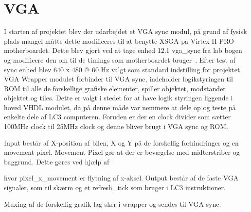 \section{VGA}
I starten af projektet blev der udarbejdet et VGA sync modul, på grund af fysisk plads mangel måtte dette modificeres til at benytte XSGA på Virtex-II PRO motherboardet. Dette blev gjort ved at tage enhed 12.1 vga\_sync fra lab bogen~\cite{chu} og modificere den om til de timings som motherboardet bruger~\cite{hardwaremanual tabel 2-6 side 37}.
Efter test af sync enhed blev 640 x 480 @ 60 Hz valgt som standard indstilling for projektet.
VGA Wrapper modulet forbinder til VGA sync, indeholder logikstyringen til ROM til alle de forskellige grafiske elementer, spiller objektet, modstander objektet og tiles. Dette er valgt i stedet for at have logik styringen liggende i hoved VHDL modulet, da på denne måde var nemmere at dele op og teste på enkelte dele af LC3 computeren. Foruden er der en clock divider som sætter 100MHz clock til 25MHz clock og denne bliver brugt i VGA sync og ROM. 

Input består af X-position af bilen, X og Y på de forskellig forhindringer og en movement pixel. Movement Pixel gør at der er bevægelse med midterstriber og baggrund.
Dette gøres ved hjælp af 

hvor pixel\_x\_movement er flytning af x-aksel.
Output består af de faste VGA signaler, som til skærm og et refresh\_tick som bruger i LC3 instruktioner. 

Muxing af de forskellig grafik lag sker i wrapper og sendes til VGA sync.
